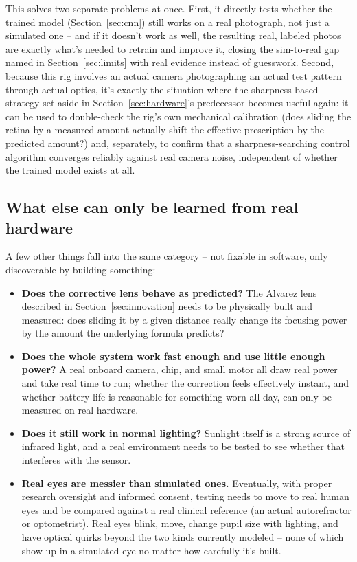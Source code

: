 \documentclass[11pt]{article}
\begin{document}
This solves two separate problems at once. First, it directly tests whether the trained model (Section~\ref{sec:cnn}) still works on a real photograph, not just a simulated one -- and if it doesn't work as well, the resulting real, labeled photos are exactly what's needed to retrain and improve it, closing the sim-to-real gap named in Section~\ref{sec:limits} with real evidence instead of guesswork. Second, because this rig involves an actual camera photographing an actual test pattern through actual optics, it's exactly the situation where the sharpness-based strategy set aside in Section~\ref{sec:hardware}'s predecessor becomes useful again: it can be used to double-check the rig's own mechanical calibration (does sliding the retina by a measured amount actually shift the effective prescription by the predicted amount?) and, separately, to confirm that a sharpness-searching control algorithm converges reliably against real camera noise, independent of whether the trained model exists at all.

\subsection{What else can only be learned from real hardware}
A few other things fall into the same category -- not fixable in software, only discoverable by building something:
\begin{itemize}
  \item \textbf{Does the corrective lens behave as predicted?} The Alvarez lens described in Section~\ref{sec:innovation} needs to be physically built and measured: does sliding it by a given distance really change its focusing power by the amount the underlying formula predicts?
  \item \textbf{Does the whole system work fast enough and use little enough power?} A real onboard camera, chip, and small motor all draw real power and take real time to run; whether the correction feels effectively instant, and whether battery life is reasonable for something worn all day, can only be measured on real hardware.
  \item \textbf{Does it still work in normal lighting?} Sunlight itself is a strong source of infrared light, and a real environment needs to be tested to see whether that interferes with the sensor.
  \item \textbf{Real eyes are messier than simulated ones.} Eventually, with proper research oversight and informed consent, testing needs to move to real human eyes and be compared against a real clinical reference (an actual autorefractor or optometrist). Real eyes blink, move, change pupil size with lighting, and have optical quirks beyond the two kinds currently modeled -- none of which show up in a simulated eye no matter how carefully it's built.
\end{itemize}
\end{document}
